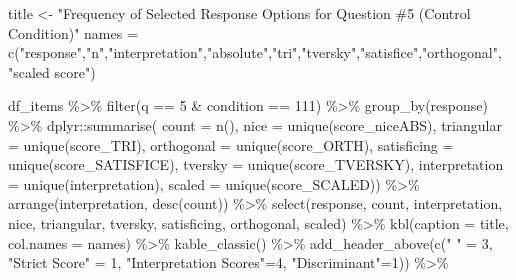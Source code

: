 \documentclass[
  letterpaper,
  DIV=11,
  numbers=noendperiod]{scrreprt}
\newenvironment{Shaded}{\begin{snugshade}}{\end{snugshade}}
\newcommand{\AttributeTok}[1]{\textcolor[rgb]{0.40,0.45,0.13}{#1}}
\newcommand{\DecValTok}[1]{\textcolor[rgb]{0.68,0.00,0.00}{#1}}
\newcommand{\FunctionTok}[1]{\textcolor[rgb]{0.28,0.35,0.67}{#1}}
\newcommand{\NormalTok}[1]{\textcolor[rgb]{0.00,0.23,0.31}{#1}}
\newcommand{\OtherTok}[1]{\textcolor[rgb]{0.00,0.23,0.31}{#1}}
\newcommand{\SpecialCharTok}[1]{\textcolor[rgb]{0.37,0.37,0.37}{#1}}
\newcommand{\StringTok}[1]{\textcolor[rgb]{0.13,0.47,0.30}{#1}}
\begin{document}
\begin{Shaded}
\begin{Highlighting}[]
\NormalTok{title }\OtherTok{\textless{}{-}} \StringTok{"Frequency of Selected Response Options for Question \#5 (Control Condition)"}
\NormalTok{names }\OtherTok{=} \FunctionTok{c}\NormalTok{(}\StringTok{"response"}\NormalTok{,}\StringTok{"n"}\NormalTok{,}\StringTok{"interpretation"}\NormalTok{,}\StringTok{"absolute"}\NormalTok{,}\StringTok{"tri"}\NormalTok{,}\StringTok{"tversky"}\NormalTok{,}\StringTok{"satisfice"}\NormalTok{,}\StringTok{"orthogonal"}\NormalTok{, }\StringTok{"scaled score"}\NormalTok{)}

\NormalTok{df\_items }\SpecialCharTok{\%\textgreater{}\%} \FunctionTok{filter}\NormalTok{(q }\SpecialCharTok{==} \DecValTok{5} \SpecialCharTok{\&}\NormalTok{ condition }\SpecialCharTok{==} \DecValTok{111}\NormalTok{) }\SpecialCharTok{\%\textgreater{}\%} \FunctionTok{group\_by}\NormalTok{(response) }\SpecialCharTok{\%\textgreater{}\%} 
\NormalTok{  dplyr}\SpecialCharTok{::}\FunctionTok{summarise}\NormalTok{( }\AttributeTok{count =} \FunctionTok{n}\NormalTok{(), }
                    \AttributeTok{nice =} \FunctionTok{unique}\NormalTok{(score\_niceABS),}
                    \AttributeTok{triangular =} \FunctionTok{unique}\NormalTok{(score\_TRI), }
                    \AttributeTok{orthogonal =}  \FunctionTok{unique}\NormalTok{(score\_ORTH),}
                    \AttributeTok{satisficing =}  \FunctionTok{unique}\NormalTok{(score\_SATISFICE),}
                    \AttributeTok{tversky =} \FunctionTok{unique}\NormalTok{(score\_TVERSKY),}
                    \AttributeTok{interpretation =} \FunctionTok{unique}\NormalTok{(interpretation),}
                    \AttributeTok{scaled =} \FunctionTok{unique}\NormalTok{(score\_SCALED)) }\SpecialCharTok{\%\textgreater{}\%} 
  \FunctionTok{arrange}\NormalTok{(interpretation, }\FunctionTok{desc}\NormalTok{(count)) }\SpecialCharTok{\%\textgreater{}\%} 
  \FunctionTok{select}\NormalTok{(response, count, interpretation, nice, }
\NormalTok{         triangular, tversky, satisficing, orthogonal, scaled) }\SpecialCharTok{\%\textgreater{}\%} 
  \FunctionTok{kbl}\NormalTok{(}\AttributeTok{caption =}\NormalTok{ title, }\AttributeTok{col.names =}\NormalTok{ names) }\SpecialCharTok{\%\textgreater{}\%}  \FunctionTok{kable\_classic}\NormalTok{() }\SpecialCharTok{\%\textgreater{}\%} 
  \FunctionTok{add\_header\_above}\NormalTok{(}\FunctionTok{c}\NormalTok{(}\StringTok{" "} \OtherTok{=} \DecValTok{3}\NormalTok{, }\StringTok{"Strict Score"} \OtherTok{=} \DecValTok{1}\NormalTok{, }\StringTok{"Interpretation Scores"}\OtherTok{=}\DecValTok{4}\NormalTok{, }\StringTok{"Discriminant"}\OtherTok{=}\DecValTok{1}\NormalTok{)) }\SpecialCharTok{\%\textgreater{}\%}

\end{Highlighting}
\end{Shaded}
\end{document}
